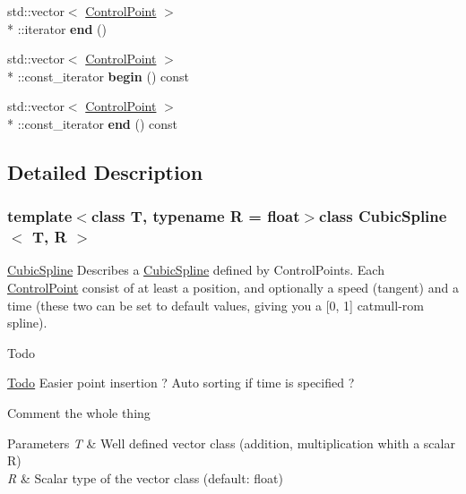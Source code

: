 \begin{DoxyCompactItemize}
\item 
\hypertarget{class_cubic_spline_af2d1718c8f709bded0f22211ce5bdcbb}{std\+::vector$<$ \hyperlink{class_cubic_spline_1_1_control_point}{Control\+Point} $>$\\*
\+::iterator {\bfseries end} ()}\label{class_cubic_spline_af2d1718c8f709bded0f22211ce5bdcbb}

\item 
\hypertarget{class_cubic_spline_a29a317e8ea68912e4a6aa8e038441437}{std\+::vector$<$ \hyperlink{class_cubic_spline_1_1_control_point}{Control\+Point} $>$\\*
\+::const\+\_\+iterator {\bfseries begin} () const }\label{class_cubic_spline_a29a317e8ea68912e4a6aa8e038441437}

\item 
\hypertarget{class_cubic_spline_a004685a928570acac100be18fe42b4fe}{std\+::vector$<$ \hyperlink{class_cubic_spline_1_1_control_point}{Control\+Point} $>$\\*
\+::const\+\_\+iterator {\bfseries end} () const }\label{class_cubic_spline_a004685a928570acac100be18fe42b4fe}

\end{DoxyCompactItemize}


\subsection{Detailed Description}
\subsubsection*{template$<$class T, typename R = float$>$class Cubic\+Spline$<$ T, R $>$}

\hyperlink{class_cubic_spline}{Cubic\+Spline} Describes a \hyperlink{class_cubic_spline}{Cubic\+Spline} defined by Control\+Points. Each \hyperlink{class_cubic_spline_1_1_control_point}{Control\+Point} consist of at least a position, and optionally a speed (tangent) and a time (these two can be set to default values, giving you a \mbox{[}0, 1\mbox{]} catmull-\/rom spline).

\begin{DoxyRefDesc}{Todo}
\item[\hyperlink{todo__todo000001}{Todo}]Easier point insertion ? Auto sorting if time is specified ? 

Comment the whole thing\end{DoxyRefDesc}



\begin{DoxyParams}{Parameters}
{\em T} & Well defined vector class (addition, multiplication whith a scalar R) \\
\hline
{\em R} & Scalar type of the vector class (default\+: float) \\
\hline
\end{DoxyParams}


